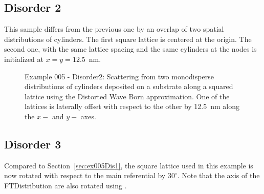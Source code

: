 \subsection{Disorder 2}
This sample differs from the previous one by an overlap of two spatial distributions of cylinders. The first square lattice is centered at the origin. The second one, with the same lattice spacing and the same cylinders at the nodes is initialized at $x=y=12.5$~nm.

\begin{figure}[H]
\hfill
{}
\hfill
{}
\hfill
\caption{Example 005 - Disorder2: Scattering from two monodisperse distributions of cylinders deposited on a substrate along a squared lattice using the Distorted Wave Born approximation. One of the lattices is laterally offset with respect to the other by 12.5~nm along the $x-$ and $y-$ axes.}
\label{fig:PythonEx5Dis2} 
\end{figure}

\subsection{Disorder 3}
Compared to Section~\ref{sec:ex005Dis1}, the square lattice used in this example is now rotated with respect to the main referential by $30^{\circ}$. Note that the axis of the FTDistribution are also rotated using .



